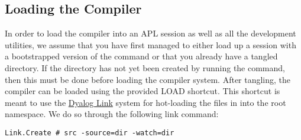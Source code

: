 \documentclass{article}%
\begin{document}
%
%
%
%
%
%
%
%
%
%
%
%
%
%
%
%
%
%
%
%
%
%
\nwdocspar

\subsection{Loading the Compiler}

In order to load the compiler into an APL session as well as all the
development utilities,
we assume that you have first managed to either load up a session
with a bootstrapped version of the {\Tt{}\nwendquote} command or that you
already have a tangled {\Tt{}\nwendquote} directory.
If the {\Tt{}\nwendquote} directory has not yet been created by running the
{\Tt{}\nwendquote} command,
then this must be done before loading the compiler system.
After tangling,
the compiler can be loaded using the provided {\Tt{}LOAD\nwendquote} shortcut.
This shortcut is meant to use the
\href{https://github.com/Dyalog/link}{Dyalog Link}
system for hot-loading the files in {\Tt{}\nwendquote} into the root namespace.
We do so through the following link command:

\begin{verbatim}
Link.Create # src -source=dir -watch=dir
\end{verbatim}
\end{document}
